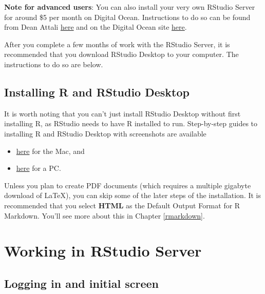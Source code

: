 \documentclass[]{tufte-book}
\providecommand{\tightlist}{%
  \setlength{\itemsep}{0pt}\setlength{\parskip}{0pt}}
\begin{document}
\textbf{Note for advanced users}: You can also install your very own RStudio Server for around \$5 per month on Digital Ocean. Instructions to do so can be found from Dean Attali \href{http://deanattali.com/2015/05/09/setup-rstudio-shiny-server-digital-ocean/}{here} and on the Digital Ocean site \href{https://www.digitalocean.com/community/tutorials/how-to-set-up-rstudio-on-an-ubuntu-cloud-server}{here}.

After you complete a few months of work with the RStudio Server, it is recommended that you download RStudio Desktop to your computer. The instructions to do so are below.

\hypertarget{installing-r-and-rstudio-desktop}{%
\subsection{Installing R and RStudio Desktop}\label{installing-r-and-rstudio-desktop}}

It is worth noting that you can't just install RStudio Desktop without first installing R, as RStudio needs to have R installed to run. Step-by-step guides to installing R and RStudio Desktop with screenshots are available

\begin{itemize}
\tightlist
\item
  \href{http://www.reed.edu/data-at-reed/software/R/r_studio.html}{here} for the Mac, and
\item
  \href{http://www.reed.edu/data-at-reed/software/R/r_studio_pc.html}{here} for a PC.
\end{itemize}

Unless you plan to create PDF documents (which requires a multiple gigabyte download of LaTeX), you can skip some of the later steps of the installation. It is recommended that you select \textbf{HTML} as the Default Output Format for R Markdown. You'll see more about this in Chapter \ref{rmarkdown}.

\hypertarget{working-in-rstudio-server}{%
\section{Working in RStudio Server}\label{working-in-rstudio-server}}

\hypertarget{logging-in-and-initial-screen}{%
\subsection{Logging in and initial screen}\label{logging-in-and-initial-screen}}
\end{document}
